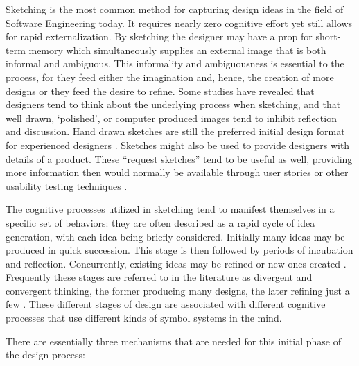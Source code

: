 \documentclass[letterpaper,10pt]{article}
\begin{document}
                Sketching is the most common method for capturing design 
                ideas in the field of Software Engineering today.  It 
                requires nearly zero cognitive effort yet still allows for 
                rapid externalization.  By sketching the designer may have a 
                prop for short-term memory which simultaneously supplies an 
                external image that is both informal and ambiguous.  This 
                informality and ambiguousness is essential to the process, 
                for they feed either the imagination and, hence, the 
                creation of more designs or they feed the desire to refine.  
                Some studies have revealed that designers tend to think about 
                the underlying process when sketching, and that well drawn, 
                ‘polished’, or computer produced images tend to inhibit 
                reflection and discussion.  Hand drawn sketches are still the 
                preferred initial design format for experienced designers 
                \cite{goel,vetting_wolf_rode}.  Sketches might also be used 
                to provide designers with details of a product.  These 
                ``request sketches'' tend to be useful as well, providing more 
                information then would normally be available through user 
                stories or other usability testing techniques 
                \cite{tohidi_buxton_baecker}.

                The cognitive processes utilized in sketching tend to 
                manifest themselves in a specific set of behaviors: they are 
                often described as a rapid cycle of idea generation, with 
                each idea being briefly considered.  Initially many ideas may 
                be produced in quick succession.  This stage is then followed 
                by periods of incubation and reflection.  Concurrently, 
                existing ideas may be refined or new ones created 
                \cite{goel,hailpern_hinterbichler_etal}.  Frequently these 
                stages are referred to in the literature as divergent and 
                convergent thinking, the former producing many designs, the 
                later refining just a few \cite{hailpern_hinterbichler_etal}.  
                These different stages of design are associated with 
                different cognitive processes that use different kinds of 
                symbol systems in the mind.

                There are essentially three mechanisms that are needed for 
                this initial phase of the design process:
\end{document}
